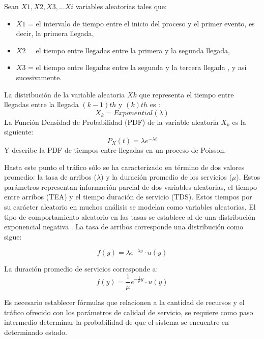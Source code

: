 Sean $X1, X2, X3, ... Xi$ variables aleatorias tales que:
\begin{itemize}
    \item $X1$ = el intervalo de tiempo entre el inicio del proceso y el primer evento, es decir, la primera llegada,
    \item $X2$ = el tiempo entre llegadas entre la primera y la segunda llegada,
    \item $X3$ = el tiempo entre llegadas entre la segunda y la tercera llegada , y así sucesivamente.
\end{itemize}
La distribución de la variable aleatoria $Xk$ que representa el tiempo entre llegadas entre la llegada $(k-1) th$ y $(k) th$ es \parencite{PoissonMedium}:
\begin{equation}
    X_{k}=Exponential(\lambda)
    \label{eqn:expon}
\end{equation}
La Función Densidad de Probabilidad (PDF) de la variable aleatoria $X_{k}$ es la siguiente:
\begin{equation}
    P_{X}(t)=\lambda e^{-\lambda t}
    \label{eqn:pdfexpon}
\end{equation}
Y describe la PDF de tiempos entre llegadas en un proceso de Poisson.\newline

Hasta este punto el tráfico sólo se ha caracterizado en término de dos valores promedio: la tasa de arribos ($\lambda$) y la duración promedio de los servicios ($\mu$). Estos parámetros representan información parcial de dos variables aleatorias, el tiempo entre arribos (TEA) y el tiempo duración de servicio (TDS). Estos tiempos por su carácter aleatorio en muchos análisis se modelan como variables aleatorias. El tipo de comportamiento aleatorio en las tasas se establece al de una distribución exponencial negativa \parencite{Carter1990}. La tasa de arribos corresponde una distribución como sigue:

\begin{equation}
f(y)=\lambda e^{-\lambda y}\cdot u(y)
\label{eqn:lambda}
\end{equation}

La duración promedio de servicios corresponde a:
\begin{equation}
f(y)=\frac{1}{\mu } e^{-\frac{1}{\mu} y} \cdot u(y)
\label{eqn:mu}
\end{equation} 

Es necesario establecer fórmulas que relacionen a la cantidad de recursos y el tráfico ofrecido con los parámetros de calidad de servicio, se requiere como paso intermedio determinar la probabilidad de que el sistema se encuentre en determinado estado.\newline

